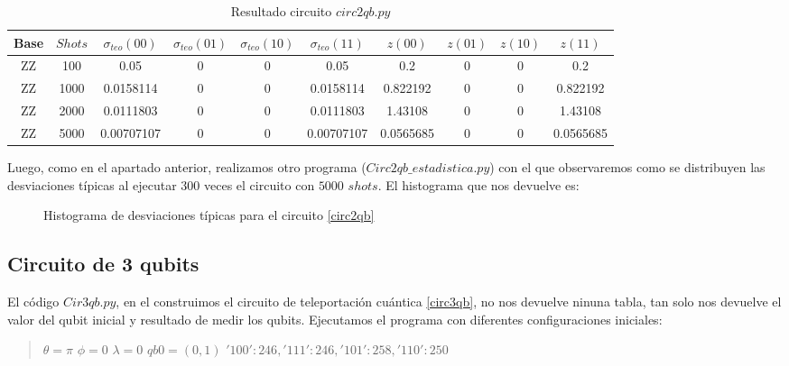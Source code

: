 \documentclass[11pt, a4paper, twocolumn]{article}
\begin{document}
\begin{table}
\begin{tabular}{cccccccccc}
\hline
 Base   &   $Shots$ &   $\sigma_{teo}(00)$ &   $\sigma_{teo}(01)$ &   $\sigma_{teo}(10)$ &   $\sigma_{teo}(11)$ &     $z(00)$ &   $z(01)$ &   $z(10)$ &     $z(11)$ \\
\hline
 ZZ     &     100 &        0.05       &                 0 &                 0 &        0.05       & 0.2       &       0 &       0 & 0.2       \\
 ZZ     &    1000 &        0.0158114  &                 0 &                 0 &        0.0158114  & 0.822192  &       0 &       0 & 0.822192  \\
 ZZ     &    2000 &        0.0111803  &                 0 &                 0 &        0.0111803  & 1.43108   &       0 &       0 & 1.43108   \\
 ZZ     &    5000 &        0.00707107 &                 0 &                 0 &        0.00707107 & 0.0565685 &       0 &       0 & 0.0565685 \\
\hline
\end{tabular}
\caption{Resultado circuito $circ2qb.py$ }

\label{tab: TablaCirc2qb}
\end{table}


\newpage

Luego, como en el apartado anterior, realizamos otro programa ($Circ2qb\_estadistica.py$)
con el que observaremos como se distribuyen las desviaciones típicas al ejecutar
$300$ veces el circuito con $5000$ $shots$. El histograma que nos devuelve es:

\begin{figure}[h!]
	\centering
	
	\caption{Histograma de desviaciones típicas para el circuito \ref{circ2qb}}
	\label{HistogramaCirc2qb}
\end{figure}

\subsection{Circuito de 3 qubits}

El código $Cir3qb.py$, en el construimos el circuito de teleportación cuántica 
\ref{circ3qb}, no nos devuelve ninuna tabla, tan solo nos devuelve el valor del 
qubit inicial y resultado de medir los qubits. Ejecutamos el programa con diferentes
configuraciones iniciales:

\begin{quote}
	$\theta = \pi$ $\phi=0$ $\lambda =  0$ \newline
	$qb0 = (0,1)$\newline
 ${'100': 246, '111': 246, '101': 258, '110': 250}$
\end{quote}
\end{document}
